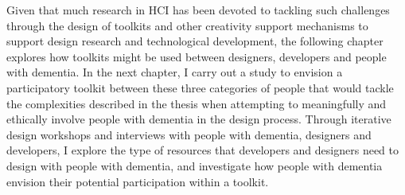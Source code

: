 Given that much research in HCI has been devoted to tackling such challenges through the design of toolkits and other creativity support mechanisms to support design research and technological development, the following chapter explores how toolkits might be used between designers, developers and people with dementia. In the next chapter, I carry out a study to envision a participatory toolkit between these three categories of people that would tackle the complexities described in the thesis when attempting to meaningfully and ethically involve people with dementia in the design process. Through iterative design workshops and interviews with people with dementia, designers and developers, I explore the type of resources that developers and designers need to design with people with dementia, and investigate how people with dementia envision their potential participation within a toolkit.


